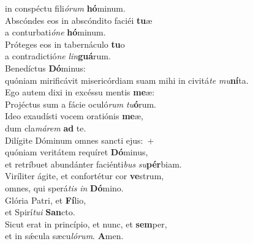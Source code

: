 \evenverse in conspéctu fili\textit{ó}\textit{rum} \textbf{hó}minum.\\
\oddverse Abscóndes eos in abscóndito faciéi \textbf{tu}æ~\*\\
\oddverse a conturbati\textit{ó}\textit{ne} \textbf{hó}minum.\\
\evenverse Próteges eos in tabernáculo \textbf{tu}o~\*\\
\evenverse a contradictió\textit{ne} \textit{lin}\textbf{guá}rum.\\
\oddverse Benedíctus \textbf{Dó}minus:~\*\\
\oddverse quóniam mirificávit misericórdiam suam mihi in civitá\textit{te} \textit{mu}\textbf{ní}ta.\\
\evenverse Ego autem dixi in excéssu mentis \textbf{me}æ:~\*\\
\evenverse Projéctus sum a fácie oculó\textit{rum} \textit{tu}\textbf{ó}rum.\\
\oddverse Ideo exaudísti vocem oratiónis \textbf{me}æ,~\*\\
\oddverse dum cla\textit{má}\textit{rem} \textbf{ad} te.\\
\evenverse Dilígite Dóminum omnes sancti ejus:~+\\
\evenverse  quóniam veritátem requíret \textbf{Dó}minus,~\*\\
\evenverse et retríbuet abundánter faciénti\textit{bus} \textit{su}\textbf{pér}biam.\\
\oddverse Viríliter ágite, et confortétur cor \textbf{ve}strum,~\*\\
\oddverse omnes, qui sperá\textit{tis} \textit{in} \textbf{Dó}mino.\\
\evenverse Glória Patri, et \textbf{Fí}lio,~\*\\
\evenverse et Spirí\textit{tu}\textit{i} \textbf{San}cto.\\
\oddverse Sicut erat in princípio, et nunc, et \textbf{sem}per,~\*\\
\oddverse et in sǽcula sæcu\textit{ló}\textit{rum}. \textbf{A}men.\\
